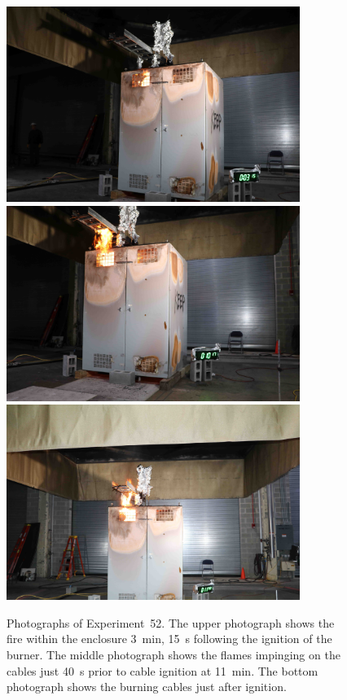 \begin{figure}[p]
\centering
\includegraphics[height=2.50in]{../FIGURES/Test_52_3_min_15_s} \\ \vspace{0.1in}
\includegraphics[height=2.50in]{../FIGURES/Test_52_10_min_17_s} \\ \vspace{0.1in}
\includegraphics[height=2.50in]{../FIGURES/Test_52_11_min_50_s}
\caption[Photographs of Experiment~52]{Photographs of Experiment~52. The upper photograph shows the fire within the enclosure 3~min, 15~s following the ignition of the burner. The middle photograph shows the flames impinging on the cables just 40~s prior to cable ignition at 11~min. The bottom photograph shows the burning cables just after ignition.}
\label{fig:Test_52_photos}
\end{figure}


